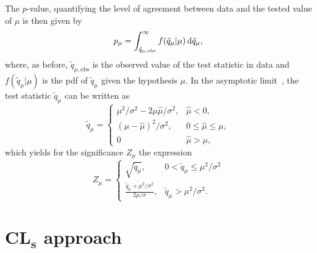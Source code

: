 The $p$-value, quantifying the level of agreement between data and the tested value of $\mu$ is then given by
\begin{equation}
		p_\mu = \int_{\tilde{q}_{\mu,\mathrm{obs}}}^{\infty}{f(\tilde{q}_\mu\vert \mu)\mathop{}\!\mathrm{d} \tilde{q}_\mu},
		\label{eq:pmu}
\end{equation}
where, as before, $\tilde{q}_{\mu,\mathrm{obs}}$ is the observed value of the test statistic in data and $f(\tilde{q}_\mu\vert \mu)$ is the \gls{pdf} of $\tilde{q}_\mu$ given the hypothesis $\mu$.
In the asymptotic limit~\cite{Cowan:2010js}, the test statistic $\tilde{q}_\mu$ can be written as
\begin{equation}
	\tilde{q}_\mu = 
\begin{cases}
    \mu^2/\sigma^2 - 2\mu\hat{\mu}/\sigma^2, & \hat{\mu} < 0,\\
    (\mu-\hat{\mu})^2/\sigma^2,              & 0 \leq \hat{\mu} \leq \mu, \\
    0  & \hat{\mu} > \mu,
\end{cases}
\end{equation}
which yields for the significance $Z_\mu$ the expression
\begin{equation}
	Z_\mu = 
\begin{cases}
    \sqrt{\tilde{q}_\mu}, & 0 < \tilde{q}_\mu \leq \mu^2/\sigma^2 \\
    \frac{\tilde{q}_\mu + \mu^2/\sigma^2}{2\mu/\sigma},              & \tilde{q}_\mu > \mu^2/\sigma^2 .
\end{cases}
\end{equation}

\section[CL$_s$ approach]{CL$\boldsymbol{_s}$ approach}\label{sec:cls_approach}

